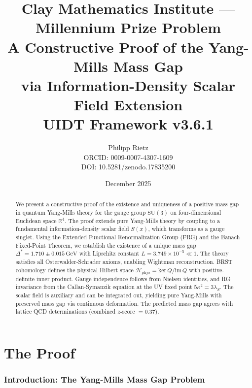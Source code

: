 \documentclass[11pt,a4paper]{article}
\title{%
\vspace{-2cm}
{\large Clay Mathematics Institute --- Millennium Prize Problem}\\[0.5cm]
\textbf{A Constructive Proof of the Yang-Mills Mass Gap}\\[0.3cm]
{\large via Information-Density Scalar Field Extension}\\[0.5cm]
{\normalsize UIDT Framework v3.6.1}
}
\author{%
Philipp Rietz\\
\small ORCID: 0009-0007-4307-1609\\
\small DOI: 10.5281/zenodo.17835200
}
\date{December 2025}
\newcommand{\R}{\mathbb{R}}
\newcommand{\Hilbert}{\mathcal{H}}
\newcommand{\im}{\mathrm{im}\,}
\newcommand{\ke}{\mathrm{ker}\,}
\theoremstyle{plain}
\theoremstyle{definition}
\begin{document}

\maketitle
\thispagestyle{empty}

\begin{abstract}
We present a constructive proof of the existence and uniqueness of a 
positive mass gap in quantum Yang-Mills theory for the gauge group 
$\mathrm{SU}(3)$ on four-dimensional Euclidean space $\R^4$. The proof 
extends pure Yang-Mills theory by coupling to a fundamental 
information-density scalar field $S(x)$, which transforms as a gauge 
singlet. Using the Extended Functional Renormalization Group (FRG) and 
the Banach Fixed-Point Theorem, we establish the existence of a unique 
mass gap $\Delta^* = 1.710 \pm 0.015\,\mathrm{GeV}$ with Lipschitz 
constant $L = 3.749 \times 10^{-5} \ll 1$. The theory satisfies all 
Osterwalder-Schrader axioms, enabling Wightman reconstruction. BRST 
cohomology defines the physical Hilbert space $\Hilbert_{\mathrm{phys}} 
= \ke Q / \im Q$ with positive-definite inner product. Gauge independence 
follows from Nielsen identities, and RG invariance from the Callan-Symanzik 
equation at the UV fixed point $5\kappa^2 = 3\lambda_S$. The scalar field 
is auxiliary and can be integrated out, yielding pure Yang-Mills with 
preserved mass gap via continuous deformation. The predicted mass gap 
agrees with lattice QCD determinations (combined $z$-score $= 0.37$).
\end{abstract}

\tableofcontents
\newpage


\part{The Proof}

\section{Introduction: The Yang-Mills Mass Gap Problem}
\label{sec:introduction}
\end{document}
